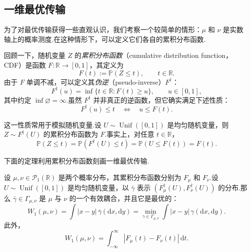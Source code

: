 \subsection{一维最优传输}\label{sec:1.3}

为了对最优传输获得一些直观认识，我们考察一个较简单的情形：$\mu$ 和 $\nu$ 是实数轴上的概率测度.在这种情形下，可以定义它们各自的累积分布函数.

回顾一下，随机变量 $Z$ 的\emph{累积分布函数}（cumulative distribution function，CDF）是函数 $F:\mathbb R\to[0,1]$，其定义为
$$
F(t):=\mathbb P(Z\le t),\qquad t\in\mathbb R.
$$
由于 $F$ 单调不减，可以定义其\emph{伪逆}（pseudo-inverse）$F^\dagger$：
$$
F^\dagger(u)=\inf\{t\in\mathbb R:F(t)\ge u\},\qquad u\in[0,1],
$$
其中约定 $\inf\varnothing=\infty$.虽然 $F^\dagger$ 并非真正的逆函数，但它确实满足下述性质：
\begin{equation}\label{eq:1.5}
F^\dagger(u)\le t\quad\Longleftrightarrow\quad u\le F(t).
\end{equation}

这一性质常用于模拟随机变量.设 $U\sim\operatorname{Unif}([0,1])$ 是均匀随机变量，则 $Z\sim F^\dagger(U)$ 的累积分布函数为 $F$.事实上，对任意 $t\in\mathbb R$，
\begin{equation}\label{eq:1.6}
\mathbb P(Z\le t)=\mathbb P(F^\dagger(U)\le t)
=\mathbb P(U\le F(t))=F(t).
\end{equation}

下面的定理利用累积分布函数刻画一维最优传输.

\begin{theorem}\label{thm:1.7}
设 $\mu,\nu\in\mathcal P_1(\mathbb R)$ 是两个概率分布，其累积分布函数分别为 $F_\mu$ 和 $F_\nu$.设 $U\sim\operatorname{Unif}([0,1])$ 是均匀随机变量，以 $\bar\gamma$ 表示 $(F_\mu^\dagger(U),F_\nu^\dagger(U))$ 的分布.那么 $\bar\gamma\in\Gamma_{\mu,\nu}$ 是 $\mu$ 与 $\nu$ 的一个有效耦合，并且它是最优的：
$$
W_1(\mu,\nu)=\int|x-y|\,\bar\gamma(\mathrm dx,\mathrm dy)
=\min_{\gamma\in\Gamma_{\mu,\nu}}\int|x-y|\,\gamma(\mathrm dx,\mathrm dy).
$$
此外，
$$
W_1(\mu,\nu)=\int_{-\infty}^{\infty}|F_\mu(t)-F_\nu(t)|\,\mathrm dt.
$$
\end{theorem}

